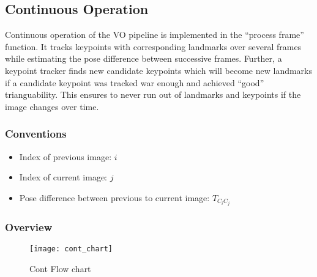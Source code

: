 \subsection{Continuous Operation}
\label{sec_cont_op}
Continuous operation of the VO pipeline is implemented in the ``process frame'' function. It tracks keypoints with corresponding landmarks over several frames while estimating the pose difference between successive frames. Further, a keypoint tracker finds new candidate keypoints which will become new landmarks if a candidate keypoint was tracked war enough and achieved ``good'' trianguability. This ensures to never run out of landmarks and keypoints if the image changes over time.

\subsubsection{Conventions}
\begin{itemize}
	\item Index of previous image: $i$
	\item Index of current image: $j$
	\item Pose difference between previous to current image: $T_{C_iC_j}$
\end{itemize}

\subsubsection{Overview}

\begin{figure}[ht]
	\centering
	\texttt{[image: cont\_chart]}
	\caption{Cont Flow chart}
	\label{img_flow_cont}
\end{figure}